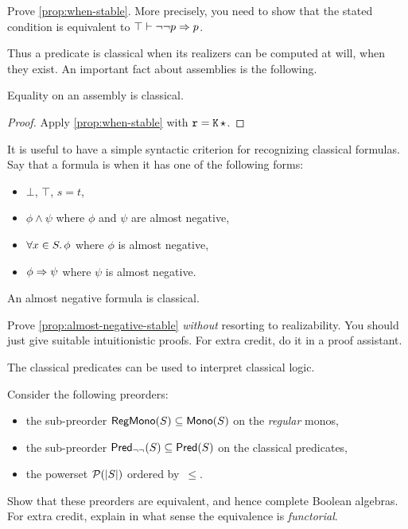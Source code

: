 \begin{exercise}
  Prove \cref{prop:when-stable}. More precisely, you need to show that the stated condition is equivalent to $\top \vdash \lnot\lnot p \Rightarrow p$.
\end{exercise}

Thus a predicate is classical when its realizers can be computed at will, when they exist.
%
An important fact about assemblies is the following.

\begin{proposition}
  Equality on an assembly is classical.
\end{proposition}

\begin{proof}
  Apply \cref{prop:when-stable} with $\mathtt{r} = \mathtt{K}\,{\star}$.
\end{proof}

It is useful to have a simple syntactic criterion for recognizing classical formulas. Say that a formula is  when it has one of the following forms:
%
\begin{itemize}
\item $\bot$, $\top$, $s = t$,
\item $\phi \land \psi$ where $\phi$ and $\psi$ are almost negative,
\item $\forall x \in S .\, \phi$ where $\phi$ is almost negative,
\item $\phi \Rightarrow \psi$ where $\psi$ is almost negative.
\end{itemize}

\begin{proposition}
  \label{prop:almost-negative-stable}
  An almost negative formula is classical.
\end{proposition}

\begin{exercise}
  Prove \cref{prop:almost-negative-stable} \emph{without} resorting to realizability. You should just give suitable intuitionistic proofs. For extra credit, do it in a proof assistant.
\end{exercise}

The classical predicates can be used to interpret classical logic.

\begin{exercise}
  Consider the following preorders:
  \begin{itemize}
  \item the sub-preorder $\mathsf{RegMono}(S) \subseteq \mathsf{Mono}(S)$ on the \emph{regular} monos,
  \item the sub-preorder $\mathsf{Pred}_{\lnot\lnot}(S) \subseteq \mathsf{Pred}(S)$ on the classical predicates,
  \item the powerset $\mathcal{P}(|S|)$ ordered by~$\leq$.
  \end{itemize}
  Show that these preorders are equivalent, and hence complete Boolean algebras.
  For extra credit, explain in what sense the equivalence is \emph{functorial}.
\end{exercise}


